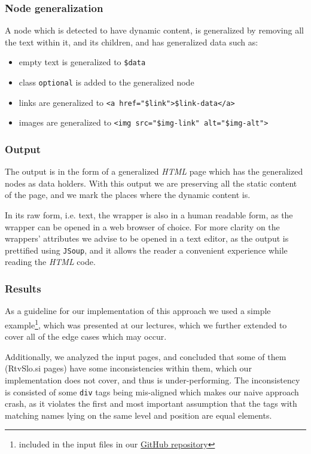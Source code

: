 \documentclass{article}
\begin{document}
	\subsubsection{Node generalization}
	A node which is detected to have dynamic content, is generalized by removing all the text within it, and its children, and has generalized data such as:
	\begin{itemize}
		\item empty text is generalized to \texttt{\$data}
		\item class \texttt{optional} is added to the generalized node
		\item links are generalized to \texttt{<a href="\$link">\$link-data</a>}
		\item images are generalized to \texttt{<img src="\$img-link" alt="\$img-alt">}
	\end{itemize}
	
	\subsubsection{Output}
	The output is in the form of a generalized \textit{HTML} page which has the generalized nodes as data holders. With this output we are preserving all the static content of the page, and we mark the places where the dynamic content is.
	
	In its raw form, i.e. text, the wrapper is also in a human readable form, as the wrapper can be opened in a web browser of choice. For more clarity on the wrappers' attributes we advise to be opened in a text editor, as the output is prettified using \texttt{JSoup}, and it allows the reader a convenient experience while reading the \textit{HTML} code.
	
	\subsubsection{Results}
	As a guideline for our implementation of this approach we used a simple example\footnote{included in the input files in our \href{https://github.com/pr3mar/ieps-parser}{GitHub repository}}, which was presented at our lectures, which we further extended to cover all of the edge cases which may occur.
	
	Additionally, we analyzed the input pages, and concluded that some of them (RtvSlo.si pages) have some inconsistencies within them, which our implementation does not cover, and thus is under-performing. The inconsistency is consisted of some \texttt{div} tags being mis-aligned which makes our naive approach crash, as it violates the first and most important assumption that the tags with matching names lying on the same level and position are equal elements.
	
\end{document}
